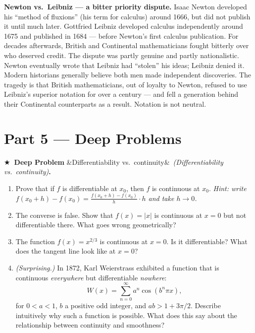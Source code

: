 \documentclass[12pt, a4paper]{article}
\newcounter{problem}
\newcounter{deepproblem}
\newenvironment{deepproblem}[1][]{%
  \refstepcounter{deepproblem}%
  \par\vspace{6pt}%
  \noindent\textbf{\color{NavyBlue}$\bigstar$\ Deep Problem \thedeepproblem}%
  \ifx&#1&\else\ \textit{(#1)}\fi\textbf{.}\enskip
}{\par\vspace{4pt}}
\begin{document}
\begin{thought}
\textbf{Newton vs.\ Leibniz --- a bitter priority dispute.}
Isaac Newton developed his ``method of fluxions'' (his term for calculus) around 1666, but did not publish it until much later. Gottfried Leibniz developed calculus independently around 1675 and published in 1684 --- before Newton's first calculus publication. For decades afterwards, British and Continental mathematicians fought bitterly over who deserved credit. The dispute was partly genuine and partly nationalistic. Newton eventually wrote that Leibniz had ``stolen'' his ideas; Leibniz denied it. Modern historians generally believe both men made independent discoveries. The tragedy is that British mathematicians, out of loyalty to Newton, refused to use Leibniz's superior notation for over a century --- and fell a generation behind their Continental counterparts as a result. Notation is not neutral.
\end{thought}

\section{Part 5 \texorpdfstring{---}{--} Deep Problems}

\begin{deepproblem}[Differentiability vs.\ continuity]
\begin{enumerate}[label=(\alph*)]
  \item Prove that if $f$ is differentiable at $x_0$, then $f$ is continuous at $x_0$. \textit{Hint: write $f(x_0+h) - f(x_0) = \frac{f(x_0+h)-f(x_0)}{h} \cdot h$ and take $h \to 0$.}
  \item The converse is false. Show that $f(x) = |x|$ is continuous at $x = 0$ but not differentiable there. What goes wrong geometrically?
  \item The function $f(x) = x^{2/3}$ is continuous at $x = 0$. Is it differentiable? What does the tangent line look like at $x = 0$?
  \item \textit{(Surprising.)} In 1872, Karl Weierstrass exhibited a function that is continuous \emph{everywhere} but differentiable \emph{nowhere}:
  \[
    W(x) = \sum_{n=0}^{\infty} a^n \cos(b^n \pi x),
  \]
  for $0 < a < 1$, $b$ a positive odd integer, and $ab > 1 + 3\pi/2$. Describe intuitively why such a function is possible. What does this say about the relationship between continuity and smoothness?
\end{enumerate}
\end{deepproblem}
\end{document}
